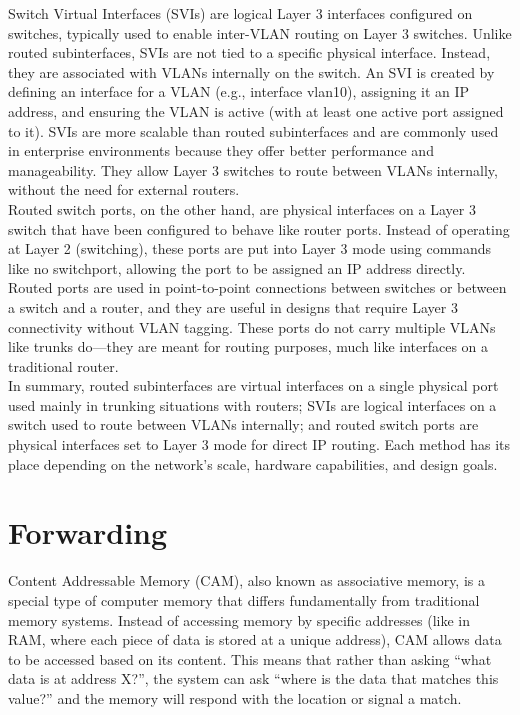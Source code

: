 \documentclass{article}
\begin{document}
Switch Virtual Interfaces (SVIs) are logical Layer 3 interfaces configured on switches, typically used to enable inter-VLAN routing on Layer 3 switches. Unlike routed subinterfaces, SVIs are not tied to a specific physical interface. Instead, they are associated with VLANs internally on the switch. An SVI is created by defining an interface for a VLAN (e.g., interface vlan10), assigning it an IP address, and ensuring the VLAN is active (with at least one active port assigned to it). SVIs are more scalable than routed subinterfaces and are commonly used in enterprise environments because they offer better performance and manageability. They allow Layer 3 switches to route between VLANs internally, without the need for external routers.\\

Routed switch ports, on the other hand, are physical interfaces on a Layer 3 switch that have been configured to behave like router ports. Instead of operating at Layer 2 (switching), these ports are put into Layer 3 mode using commands like no switchport, allowing the port to be assigned an IP address directly. Routed ports are used in point-to-point connections between switches or between a switch and a router, and they are useful in designs that require Layer 3 connectivity without VLAN tagging. These ports do not carry multiple VLANs like trunks do—they are meant for routing purposes, much like interfaces on a traditional router.\\

In summary, routed subinterfaces are virtual interfaces on a single physical port used mainly in trunking situations with routers; SVIs are logical interfaces on a switch used to route between VLANs internally; and routed switch ports are physical interfaces set to Layer 3 mode for direct IP routing. Each method has its place depending on the network’s scale, hardware capabilities, and design goals.\\

\section*{Forwarding}

Content Addressable Memory (CAM), also known as associative memory, is a special type of computer memory that differs fundamentally from traditional memory systems. Instead of accessing memory by specific addresses (like in RAM, where each piece of data is stored at a unique address), CAM allows data to be accessed based on its content. This means that rather than asking “what data is at address X?”, the system can ask “where is the data that matches this value?” and the memory will respond with the location or signal a match.\\
\end{document}
